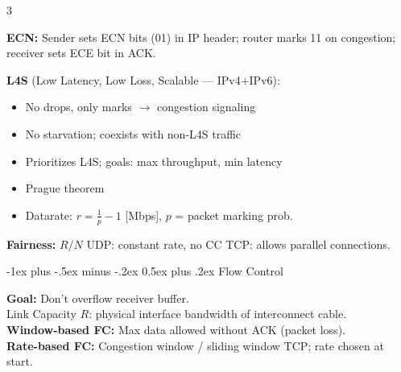 \documentclass[10pt,landscape]{article}
\makeatletter
\renewcommand{\section}{\@startsection{section}{1}{0mm}%
                                {-1ex plus -.5ex minus -.2ex}%
                                {0.5ex plus .2ex}%
                                {\normalfont\large\bfseries}}
\makeatother
\begin{document}
\begin{multicols}{3}
{{
    }
}

\textbf{ECN:} Sender sets ECN bits (01) in IP header; router marks 11 on congestion; receiver sets ECE bit in ACK.

\textbf{L4S} (Low Latency, Low Loss, Scalable — IPv4+IPv6):
\begin{itemize}\setlength\itemsep{0pt}
  \item No drops, only marks $\rightarrow$ congestion signaling
  \item No starvation; coexists with non-L4S traffic
  \item Prioritizes L4S; goals: max throughput, min latency
  \item Prague theorem
  \item Datarate: $r = \frac{1}{p}-1$ [Mbps], $p$ = packet marking prob.
\end{itemize}

\textbf{Fairness:} $R/N$ \quad UDP: constant rate, no CC \quad TCP: allows parallel connections.

\section{Flow Control}

\textbf{Goal:} Don't overflow receiver buffer.\\
Link Capacity $R$: physical interface bandwidth of interconnect cable.\\
\textbf{Window-based FC:} Max data allowed without ACK (packet loss).\\
\textbf{Rate-based FC:} Congestion window / sliding window TCP; rate chosen at start.


\end{multicols}
\end{document}
